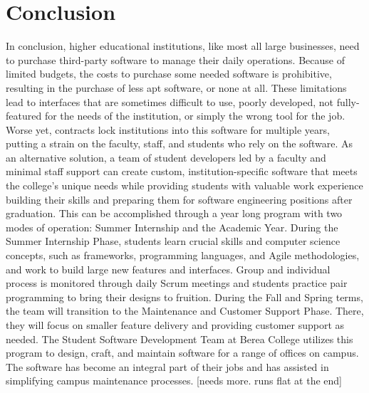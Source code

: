 \section{Conclusion}
In conclusion, higher educational institutions, like most all large businesses, need to purchase third-party software to manage their daily operations. Because of limited budgets, the costs to purchase some needed software is prohibitive, resulting in the purchase of less apt software, or none at all. These limitations lead to interfaces that are sometimes difficult to use, poorly developed, not fully-featured for the needs of the institution, or simply the wrong tool for the job. Worse yet, contracts lock institutions into this software for multiple years, putting a strain on the faculty, staff, and students who rely on the software. As an alternative solution, a team of student developers led by a faculty and minimal staff support can create custom, institution-specific software that meets the college's unique needs while providing students with valuable work experience building their skills and preparing them for software engineering positions after graduation. This can be accomplished through a year long program with two modes of operation: Summer Internship and the Academic Year. During the Summer Internship Phase, students learn crucial skills and computer science concepts, such as frameworks, programming languages, and Agile methodologies, and work to build large new features and interfaces. Group and individual process is monitored through daily Scrum meetings and students practice pair programming to bring their designs to fruition. During the Fall and Spring terms, the team will transition to the Maintenance and Customer Support Phase. There, they will focus on smaller feature delivery and providing customer support as needed. The Student Software Development Team at Berea College utilizes this program to design, craft, and maintain software for a range of offices on campus. The software has become an integral part of their jobs and has assisted in simplifying campus maintenance processes. [needs more. runs flat at the end]